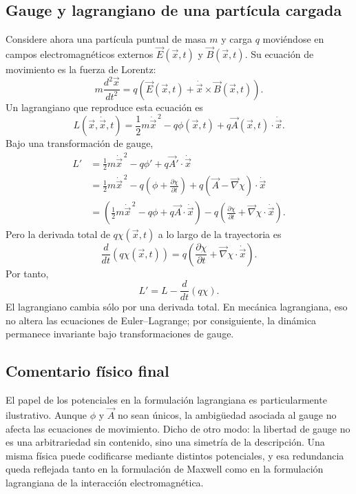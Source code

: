 \documentclass[12pt,a4paper]{article}
\theoremstyle{definition}
\theoremstyle{plain}
\numberwithin{equation}{section}
\theoremstyle{remark}
\newcommand{\E}{\vec{E}}
\newcommand{\B}{\vec{B}}
\begin{document}
\subsection*{Gauge y lagrangiano de una partícula cargada}
Considere ahora una partícula puntual de masa $m$ y carga $q$ moviéndose en campos electromagnéticos externos $\E(\vec x,t)$ y $\B(\vec x,t)$. Su ecuación de movimiento es la fuerza de Lorentz:
\begin{equation*}
    m\frac{d^2\vec x}{dt^2} = q\left(\E(\vec x,t) + \dot{\vec x}\times\B(\vec x,t)\right).
\end{equation*}
Un lagrangiano que reproduce esta ecuación es
\begin{equation*}
    L(\vec x,\dot{\vec x},t)=\frac{1}{2}m\dot{\vec x}^{\,2}-q\phi(\vec x,t)+q\vec A(\vec x,t)\cdot\dot{\vec x}.
\end{equation*}
Bajo una transformación de gauge,
\begin{align*}
    L' &= \frac{1}{2}m\dot{\vec x}^{\,2} - q\phi' + q\vec A'\cdot\dot{\vec x} \\
    &= \frac{1}{2}m\dot{\vec x}^{\,2} - q\left(\phi + \frac{\partial \chi}{\partial t}\right) + q\left(\vec A - \vec\nabla\chi\right)\cdot\dot{\vec x} \\
    &= \left(\frac{1}{2}m\dot{\vec x}^{\,2}-q\phi+q\vec A\cdot\dot{\vec x}\right) - q\left(\frac{\partial \chi}{\partial t}+\vec\nabla\chi\cdot\dot{\vec x}\right).
\end{align*}
Pero la derivada total de $q\chi(\vec x,t)$ a lo largo de la trayectoria es
\begin{equation*}
    \frac{d}{dt}\left(q\chi(\vec x,t)\right)
    = q\left(\frac{\partial \chi}{\partial t}+\vec\nabla\chi\cdot\dot{\vec x}\right).
\end{equation*}
Por tanto,
\begin{equation*}
    L' = L - \frac{d}{dt}\left(q\chi\right).
\end{equation*}
El lagrangiano cambia sólo por una derivada total. En mecánica lagrangiana, eso no altera las ecuaciones de Euler--Lagrange; por consiguiente, la dinámica permanece invariante bajo transformaciones de gauge.

\subsection*{Comentario físico final}
El papel de los potenciales en la formulación lagrangiana es particularmente ilustrativo. Aunque $\phi$ y $\vec A$ no sean únicos, la ambigüedad asociada al gauge no afecta las ecuaciones de movimiento. Dicho de otro modo: la libertad de gauge no es una arbitrariedad sin contenido, sino una simetría de la descripción. Una misma física puede codificarse mediante distintos potenciales, y esa redundancia queda reflejada tanto en la formulación de Maxwell como en la formulación lagrangiana de la interacción electromagnética.
\end{document}
